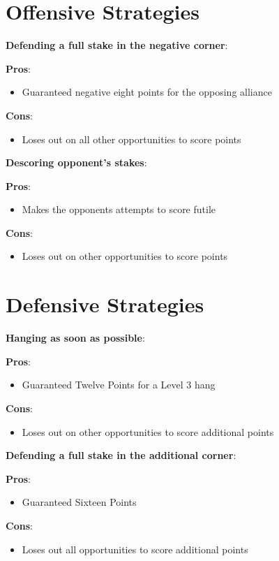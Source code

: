     \section*{Offensive Strategies}
\noindent
    \textbf{Defending a full stake in the negative corner}:

\noindent
\textbf{Pros}:
\begin{itemize}
    \item Guaranteed negative eight points for the opposing alliance 
\end{itemize}
\textbf{Cons}:
\begin{itemize}
    \item Loses out on all other opportunities to score points 
\end{itemize}

    \textbf{Descoring opponent's stakes}:

\noindent
\textbf{Pros}:
\begin{itemize}
    \item Makes the opponents attempts to score futile 
\end{itemize}
\textbf{Cons}:
\begin{itemize}
    \item Loses out on other opportunities to score points 
\end{itemize}
    \section*{Defensive Strategies}
    \noindent
    \textbf{Hanging as soon as possible}:

\noindent
\textbf{Pros}:
\begin{itemize}
    \item Guaranteed Twelve Points for a Level 3 hang
\end{itemize}
\textbf{Cons}:
\begin{itemize}
    \item Loses out on other opportunities to score additional points 
\end{itemize}

\noindent
    \textbf{Defending a full stake in the additional corner}:

\noindent
\textbf{Pros}:
\begin{itemize}
    \item Guaranteed Sixteen Points 
\end{itemize}
\textbf{Cons}:
\begin{itemize}
    \item Loses out all opportunities to score additional points 
\end{itemize}

